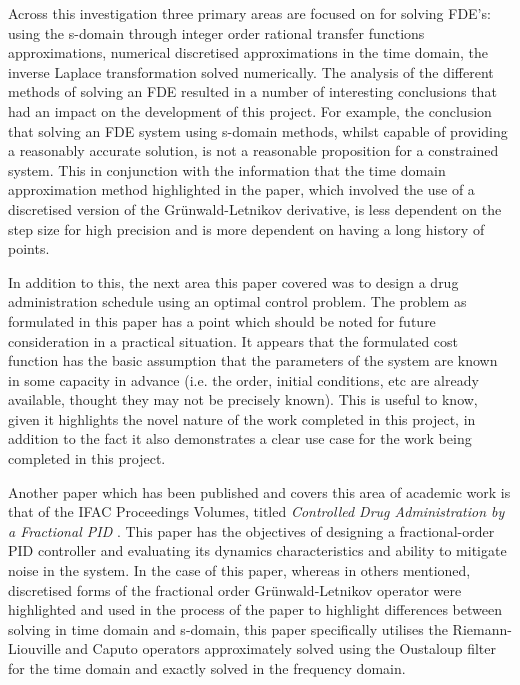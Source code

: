 Across this investigation three primary areas are focused on for solving FDE's: using the s-domain through integer order rational transfer functions approximations, numerical discretised approximations in the time domain, the inverse Laplace transformation solved numerically. The analysis of the different methods of solving an FDE resulted in a number of interesting conclusions that had an impact on the development of this project. For example, the conclusion that solving an FDE system using s-domain methods, whilst capable of providing a reasonably accurate solution, is not a reasonable proposition for a constrained system. This in conjunction with the information that the time domain approximation method highlighted in the paper, which involved the use of a discretised version of the Gr\"{u}nwald-Letnikov derivative, is less dependent on the step size for high precision and is more dependent on having a long history of points.

In addition to this, the next area this paper covered was to design a drug administration schedule using an optimal control problem. The problem as formulated in this paper has a point which should be noted for future consideration in a practical situation. It appears that the formulated cost function has the basic assumption that the parameters of the system are known in some capacity in advance (i.e. the order, initial conditions, etc are already available, thought they may not be precisely known). This is useful to know, given it highlights the novel nature of the work completed in this project, in addition to the fact it also demonstrates a clear use case for the work being completed in this project. 

Another paper which has been published and covers this area of academic work is that of the IFAC Proceedings Volumes, titled \textit{Controlled Drug Administration by a Fractional PID} \cite{Controlled_Drug_Administration}. This paper has the objectives of designing a fractional-order PID controller and evaluating its dynamics characteristics and ability to mitigate noise in the system. In the case of this paper, whereas in others mentioned, discretised forms of the fractional order Gr\"{u}nwald-Letnikov operator were highlighted and used in the process of the paper to highlight differences between solving in time domain and s-domain, this paper specifically utilises the Riemann-Liouville and Caputo operators approximately solved using the Oustaloup filter for the time domain and exactly solved in the frequency domain. 


